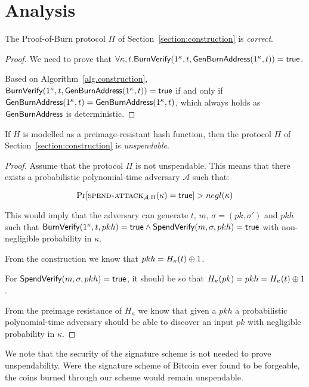 \section{Analysis}

\begin{theorem}[Correctness]
  The Proof-of-Burn protocol $\Pi$ of Section~\ref{section:construction} is \emph{correct}.
\end{theorem}
\begin{proof}
  We need to prove that $\forall \kappa, t. \mathsf{BurnVerify}(1^\kappa, t, \mathsf{GenBurnAddress}(1^\kappa, t)) = \textsf{true}$.

  Based on Algorithm~\ref{alg.construction}, $\mathsf{BurnVerify}(1^\kappa, t, \mathsf{GenBurnAddress}(1^\kappa, t)) = \textsf{true}$ if and only if $\mathsf{GenBurnAddress}(1^\kappa, t) = \mathsf{GenBurnAddress}(1^\kappa, t)$, which always holds as $\mathsf{GenBurnAddress}$ is deterministic.
\end{proof}

\begin{theorem}[Unspendability]
  If $H$ is modelled as a preimage-resistant hash function, then the protocol $\Pi$ of Section~\ref{section:construction} is \emph{unspendable}.
\end{theorem}
\begin{proof}
  Assume that the protocol $\Pi$ is not unspendable. This means that there exists a probabilistic polynomial-time adversary $\mathcal{A}$ such that:

  \[
    \Pr[\textsc{spend-attack}_{\mathcal{A},
    \Pi}(\kappa) = \textsf{true}] > negl(\kappa)
  \]

  This would imply that the adversary can generate $t$, $m$, $\sigma = (pk, \sigma')$ and $pkh$ such that $\mathsf{BurnVerify}(1^\kappa, t, pkh) = \mathsf{true} \land \mathsf{SpendVerify}(m, \sigma, pkh) = \mathsf{true}$ with non-negligible probability in $\kappa$.

  From the construction we know that $pkh = H_\kappa(t) \oplus 1$.

  For $\mathsf{SpendVerify}(m, \sigma, pkh) = \mathsf{true}$, it should be so that $H_\kappa(pk) = pkh = H_\kappa(t) \oplus 1$.

  From the preimage resistance of $H_\kappa$ we know that given a $pkh$ a probabilistic polynomial-time adversary should be able to discover an input $pk$ with negligible probability in $\kappa$.
\end{proof}

We note that the security of the signature scheme is not needed to prove unspendability. Were the signature scheme of Bitcoin ever found to be forgeable, the coins burned through our scheme would remain unspendable.


